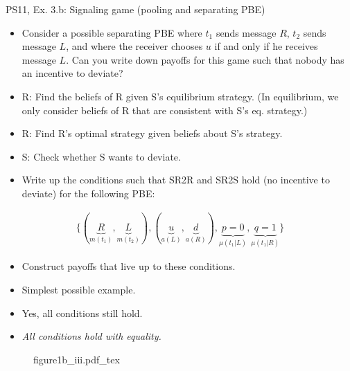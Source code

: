 \begin{frame}{PS11, Ex. 3.b: Signaling game (pooling and separating PBE)}
    \begin{itemize}
        \item[(b)] Consider a possible separating PBE where $t_1$ sends message $R$, $t_2$ sends message $L$, and where the receiver chooses $u$ if and only if he receives message $L$. Can you write down payoffs for this game such that nobody has an incentive to deviate?
    \end{itemize} \vspace{-8pt}
    \begin{multicols}{2}
      \begin{itemize}
        \item[SR3:] R: Find the beliefs of R given S's equilibrium strategy. (In equilibrium, we only consider beliefs of R that are consistent with S's eq. strategy.)
        \item[SR2R:] R: Find R's optimal strategy given beliefs about S's strategy.
        \item[SR2S:] S: Check whether S wants to deviate.
        \item[PBE:]  Write up the conditions such that SR2R and SR2S hold (no incentive to deviate) for the following PBE:
      \end{itemize}\vspace{-14pt}
      \begin{align*}
        \{(\underbrace{R}_{m(t_1)},\underbrace{L}_{m(t_2)}),(\underbrace{u}_{a(L)},\underbrace{d}_{a(R)}),\underbrace{p=0}_{\mu(t_1|L)},\underbrace{q=1}_{\mu(t_1|R)}\}
      \end{align*}\vspace{-12pt}
      \begin{itemize}
        \item[$\rightarrow$] Construct payoffs that live up to these conditions.
        \item[i:] Simplest possible example.
        \item[ii:] Yes, all conditions still hold.
        \item[iii:] \textit{All conditions hold with equality.}
      \end{itemize}
      \vfill\null\columnbreak
      \begin{figure}[!h]
        \center
        \def\svgwidth{1.1\columnwidth}
        {figure1b_iii.pdf_tex}
      \end{figure} \vspace{-8pt}

\end{multicols}
\end{frame}
